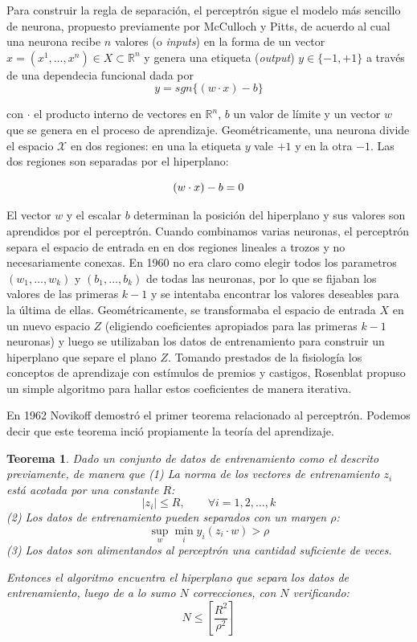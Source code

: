 \documentclass{report}
\newtheorem{thm}{Teorema}[section]
\begin{document}
Para construir la regla de separación, el perceptrón sigue el modelo más sencillo de neurona, propuesto previamente por McCulloch y Pitts, de acuerdo al cual una neurona recibe
\(n\) valores (o \textit{inputs}) en la forma de un vector \(x = (x^1,\dots, x^n) \in X \subset \mathbb{R}^n \) y genera una etiqueta (\textit{output}) 
\(y\in\{-1,+1\}\) a través de una dependecia funcional dada por
\[
y = sgn\{(w\cdot x)-b\}
\]

con \(\cdot\) el producto interno de vectores en \(\mathbb{R}^n\), \(b\) un valor de límite y un vector \(w\) que se genera en el proceso de aprendizaje. Geométricamente, una 
neurona divide el espacio \(\mathcal{X}\) en dos regiones: en una la etiqueta \(y\) vale \(+1\) y en la otra \(-1\). Las dos regiones son separadas por el hiperplano:\newline

\[
(w\cdot x) - b = 0 \newline
\]

El vector \(w\) y el escalar \(b\) determinan la posición del hiperplano y sus valores son aprendidos por el perceptrón. Cuando combinamos varias neuronas, el perceptrón
separa el espacio de entrada en en dos regiones lineales a trozos y no necesariamente conexas. En 1960 no era claro como elegir todos los parametros \((w_1,\dots,w_k)\) y
\((b_1,\dots, b_k)\) de todas las neuronas, por lo que se fijaban los valores de las primeras \(k-1\) y se intentaba encontrar los valores deseables para la última
de ellas. Geométricamente, se transformaba el espacio de entrada $X$ en un nuevo espacio $Z$ (eligiendo coeficientes apropiados para las primeras $k-1$ neuronas) y luego
se utilizaban los datos de entrenamiento para construir un hiperplano que separe el plano $Z$. Tomando prestados de la fisiología los conceptos de aprendizaje con estímulos de premios y castigos, Rosenblat propuso un simple algoritmo para hallar estos 
coeficientes de manera iterativa.\newline


En 1962 Novikoff demostró el primer teorema relacionado al perceptrón. Podemos decir que este teorema inció propiamente la teoría del aprendizaje.

\begin{thm}
Dado un conjunto de datos de entrenamiento como el descrito previamente, de manera que\newline
(1) La norma de los vectores de entrenamiento $z_i$ está acotada por una constante $R$:
\[
|z_i| \leq R, \qquad \forall i=1,2,\dots,k
\]
(2) Los datos de entrenamiento pueden separados con un margen $\rho$:
\[
\sup_{w} \min_{i} y_i(z_i\cdot w) > \rho
\]
(3) Los datos son alimentandos al perceptrón una cantidad \textit{suficiente} de veces.

Entonces el algoritmo encuentra el hiperplano que separa los datos de entrenamiento, luego de a lo
sumo $N$ correcciones, con $N$ verificando:
\[
N \leq \left [ \frac{R^2}{\rho^2}\right ]
\]

\end{thm}
\end{document}
